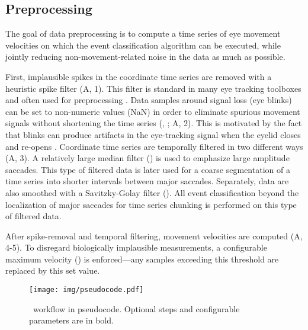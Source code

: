 \subsection*{Preprocessing}

The goal of data preprocessing is to compute a time series of eye movement
velocities on which the event classification algorithm can be executed, while jointly
reducing non-movement-related noise in the data as much as possible. 

First, implausible spikes in the coordinate time series are removed with a
heuristic spike filter \citep{stampe1993} (A, 1). This filter is
standard in many eye tracking toolboxes and often used for preprocessing
\citep[\eg][]{Friedman2018}.
%
Data samples around signal loss (\eg eye blinks) can be set to non-numeric values (NaN)
in order to eliminate spurious movement signals without shortening the time series
(, ; A, 2). This is
motivated by the fact that blinks can produce artifacts in the eye-tracking signal when the
eyelid closes and re-opens \citep{choe2016pupil}.
%
Coordinate time series are temporally filtered in two different ways
(A, 3). A relatively large median filter () is used to emphasize large amplitude saccades.  This type of
filtered data is later used for a coarse segmentation of a time series into
shorter intervals between major saccades.
%
Separately, data are also smoothed with a Savitzky-Golay filter
(). All event classification beyond the
localization of major saccades for time series chunking is performed on this
type of filtered data.

After spike-removal and temporal filtering, movement velocities are computed
(A, 4-5). To disregard biologically implausible measurements, a
configurable maximum velocity () is enforced---any samples
exceeding this threshold are replaced by this set value.

%

\begin{figure*}
  \texttt{[image: img/pseudocode.pdf]}
  \caption{\remodnav\ workflow in pseudocode. Optional steps and configurable parameters are in bold.}
  \label{fig:alg}
\end{figure*}

